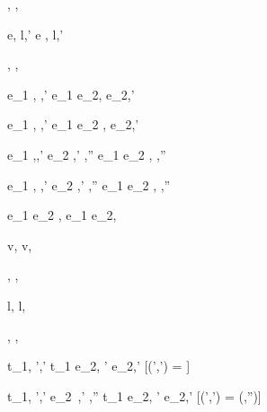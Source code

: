   {}
  {\Enter \tau,\hat{\sigma} \hat{\eval} \Enter \tau,\hat{\sigma}}

  {e,\hat{\sigma}\hat{\eval} l,\hat{\sigma}'}
  {\Update e ,\hat{\sigma}\hat{\eval} \Update l,\hat{\sigma}'}


  {}
  {\Fail,\hat{\sigma} \hat{\eval} \Fail,\hat{\sigma}}


  {e_1 ,\hat{\sigma}\hat{\eval} ,\hat{\sigma}'}
  {e_1 \Then e_2,\hat{\sigma}\hat{\eval} \Then e_2,\hat{\sigma}'}

  {e_1 ,\hat{\sigma}\hat{\eval} ,\hat{\sigma}'}
  {e_1 \Next e_2 ,\hat{\sigma}\hat{\eval}  \Next e_2,\hat{\sigma}'}


  {e_1 ,\hat{\sigma}\hat{\eval},\hat{\sigma}'\Quad
   e_2 ,\hat{\sigma}'\hat{\eval} ,\hat{\sigma}''}
  {e_1 \And e_2 ,\hat{\sigma}\hat{\eval} \And {},\hat{\sigma}''}


  {e_1 ,\hat{\sigma}\hat{\eval} ,\hat{\sigma}'\Quad
   e_2 ,\hat{\sigma}'\hat{\eval} ,\hat{\sigma}''}
  {e_1 \Or e_2 ,\hat{\sigma}\hat{\eval}  \Or {},\hat{\sigma}''}

  {}
  {e_1 \Xor e_2 ,\hat{\sigma}\hat{\eval} e_1 \Xor e_2,\hat{\sigma}}


  { }
  {\Edit v,\hat{\sigma} \hat{\stride} \Edit v,\hat{\sigma}}

  { }
  {\Enter \tau,\hat{\sigma} \hat{\stride} \Enter \tau,\hat{\sigma}}

  { }
  {\Update l,\hat{\sigma} \hat{\stride} \Update l,\hat{\sigma}}


  { }
  {\Fail,\hat{\sigma} \hat{\stride} \Fail,\hat{\sigma}}


  {t_1,\hat{\sigma} \hat{\stride} ',\hat{\sigma}'}
  {t_1 \Then e_2,\hat{\sigma} \hat{\stride} ' \Then e_2,\hat{\sigma}'}
  [\Value(',\hat{\sigma}') = \bot]

  {t_1,\hat{\sigma} \hat{\stride} ',\hat{\sigma}' \Quad
   e_2\ ,\hat{\sigma}' \hat{\eval} ,\hat{\sigma}''}
  {t_1 \Then e_2,\hat{\sigma} \hat{\stride} ' \Then e_2,\hat{\sigma}'}
  [\Value(',\hat{\sigma}') =  \land \Failing(,\hat{\sigma}'')]

